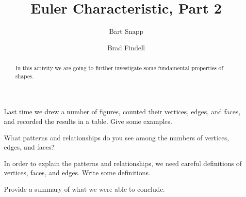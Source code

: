 \documentclass{ximera}
\title{Euler Characteristic, Part 2}
\author{Bart Snapp \and Brad Findell}
\begin{document}
\begin{abstract}
In this activity we are going to further investigate some fundamental
properties of shapes.
\end{abstract}
\maketitle

\begin{question}[3in]
Last time we drew a number of figures, counted their vertices, edges, and faces, and recorded the results in a table.  Give some examples. 
\begin{freeResponse}
\end{freeResponse}
\end{question}


\begin{question}[2in]
What patterns and relationships do you see among the numbers of vertices, edges, and faces?
\begin{freeResponse}
\end{freeResponse}
\end{question}


\begin{question}[3in]
In order to explain the patterns and relationships, we need careful definitions of vertices, faces, and edges.  Write some definitions.  
\begin{freeResponse}
\end{freeResponse}
\end{question}



\begin{question}
Provide a summary of what we were able to conclude.
\begin{freeResponse}
\end{freeResponse}
\end{question}
\end{document}
